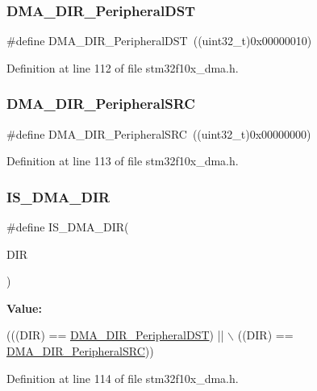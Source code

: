 \subsubsection{\texorpdfstring{D\+M\+A\+\_\+\+D\+I\+R\+\_\+\+Peripheral\+D\+ST}{DMA\_DIR\_PeripheralDST}}
{\footnotesize\ttfamily \#define D\+M\+A\+\_\+\+D\+I\+R\+\_\+\+Peripheral\+D\+ST~((uint32\+\_\+t)0x00000010)}



Definition at line 112 of file stm32f10x\+\_\+dma.\+h.

\mbox{\label{group___d_m_a__data__transfer__direction_ga5ce120a044359410136695a2c05df68e}} 
\subsubsection{\texorpdfstring{D\+M\+A\+\_\+\+D\+I\+R\+\_\+\+Peripheral\+S\+RC}{DMA\_DIR\_PeripheralSRC}}
{\footnotesize\ttfamily \#define D\+M\+A\+\_\+\+D\+I\+R\+\_\+\+Peripheral\+S\+RC~((uint32\+\_\+t)0x00000000)}



Definition at line 113 of file stm32f10x\+\_\+dma.\+h.

\mbox{\label{group___d_m_a__data__transfer__direction_gaaad13d2b5808e32a35a2d21bcdbb2296}} 
\subsubsection{\texorpdfstring{I\+S\+\_\+\+D\+M\+A\+\_\+\+D\+IR}{IS\_DMA\_DIR}}
{\footnotesize\ttfamily \#define I\+S\+\_\+\+D\+M\+A\+\_\+\+D\+IR(\begin{DoxyParamCaption}\item[{}]{D\+IR }\end{DoxyParamCaption})}

{\bfseries Value\+:}
\begin{DoxyCode}
(((DIR) == \hyperlink{group___d_m_a__data__transfer__direction_ga51567b748ddac277743c65c20275971a}{DMA\_DIR\_PeripheralDST}) || \(\backslash\)
                         ((DIR) == \hyperlink{group___d_m_a__data__transfer__direction_ga5ce120a044359410136695a2c05df68e}{DMA\_DIR\_PeripheralSRC}))
\end{DoxyCode}


Definition at line 114 of file stm32f10x\+\_\+dma.\+h.

